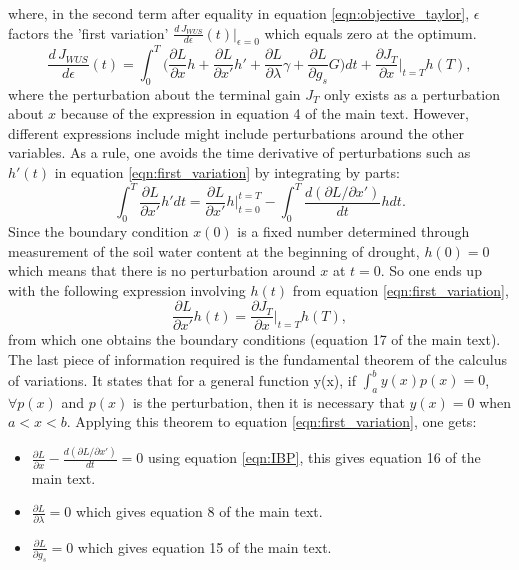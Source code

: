 \documentclass[utf8]{frontiers_suppmat} %
\begin{document}
where, in the second term after equality in equation \ref{eqn:objective_taylor}, $\epsilon$ factors the 'first variation' $\frac{d\, J_{WUS}}{d \epsilon}(t) |_{\epsilon = 0}$ which equals zero at the optimum.
\begin{equation}
    \label{eqn:first_variation}
    \frac{d\, J_{WUS}}{d \epsilon}(t) = \int_0^T \Big(\frac{\partial L}{\partial x} h + \frac{\partial L}{\partial x'} h' + \frac{\partial L}{\partial \lambda} \gamma + \frac{\partial L}{\partial g_s} G \Big) dt + \frac{\partial J_T}{\partial x}|_{t=T} h(T),
\end{equation}
where the perturbation about the terminal gain $J_T$ only exists as a perturbation about $x$ because of the expression in equation 4 of the main text. However, different expressions include might include perturbations around the other variables. As a rule, one avoids the time derivative of perturbations such as $h'(t)$ in equation \ref{eqn:first_variation} by integrating by parts:
\begin{equation}
    \label{eqn:IBP}
    \int_0^T \frac{\partial L}{\partial x'} h' dt = \frac{\partial L}{\partial x'} h |_{t=0}^{t=T} - \int_0^T \frac{d(\partial L / \partial x')}{dt} h dt.
\end{equation}
Since the boundary condition $x(0)$ is a fixed number determined through measurement of the soil water content at the beginning of drought, $h(0)=0$ which means that there is no perturbation around $x$ at $t=0$. So one ends up with the following expression involving $h(t)$ from equation \ref{eqn:first_variation},
\begin{equation}
    \frac{\partial L}{\partial x'} h(t) = \frac{\partial J_T}{\partial x}|_{t=T} h(T),
\end{equation}
from which one obtains the boundary conditions (equation 17 of the main text). The last piece of information required is the fundamental theorem of the calculus of variations. It states that for a general function y(x), if $\int_a^b y(x)p(x) = 0$, $\forall p(x)$ and $p(x)$ is the perturbation, then it is necessary that $y(x)=0$ when $a<x<b$. Applying this theorem to equation \ref{eqn:first_variation}, one gets:
\begin{itemize}
    \item $\frac{\partial L}{\partial x} - \frac{d(\partial L / \partial x')}{dt} = 0$ using equation \ref{eqn:IBP}, this gives equation 16 of the main text.
    \item  $\frac{\partial L}{\partial \lambda} = 0$ which gives equation 8 of the main text.
    \item  $\frac{\partial L}{\partial g_s} = 0$ which gives equation 15 of the main text.
\end{itemize}
\end{document}
